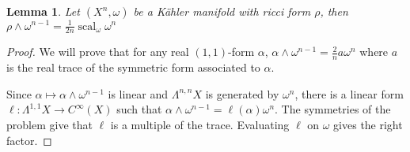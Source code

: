 \documentclass{amsart}
\newtheorem{lemma}[theorem]{Lemma}
\numberwithin{equation}{section}
\theoremstyle{definition}
\DeclareMathOperator{\scal}{scal}
\begin{document}
\begin{lemma}
Let $(X^n,\omega)$ be a K\"ahler manifold with ricci form $\rho$, then $\rho\wedge \omega^{n-1}=\frac{1}{2n}\scal_\omega\omega^n$
\end{lemma}
\begin{proof}
We will prove that for any real $(1,1)$-form $\alpha$,
$\alpha\wedge \omega^{n-1}= \tfrac{2}{n}a\omega^n$ where $a$ is the real trace of the symmetric form associated to $\alpha$.

Since $\alpha\mapsto \alpha\wedge\omega^{n-1}$ is linear and $\Lambda^{n,n}X$ is generated by $\omega^n$, there is a linear form $\ell:\Lambda^{1,1}X\to C^{\infty}(X)$ such that $\alpha\wedge\omega^{n-1}=\ell(\alpha)\omega^n$. The symmetries of the problem give that $\ell$ is a multiple of the trace. Evaluating $\ell$ on $\omega$ gives the right factor.


\end{proof}
\end{document}
